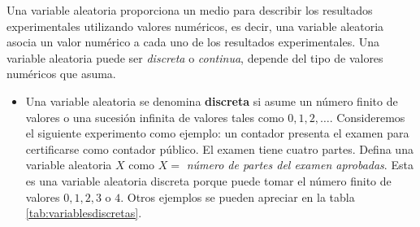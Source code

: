 \documentclass[
]{book}
\providecommand{\tightlist}{%
  \setlength{\itemsep}{0pt}\setlength{\parskip}{0pt}}
\theoremstyle{definition}
\theoremstyle{definition}
\theoremstyle{definition}
\theoremstyle{definition}
\theoremstyle{remark}
\begin{document}
Una variable aleatoria proporciona un medio para describir los resultados experimentales utilizando valores numéricos, es decir, una variable aleatoria asocia un valor numérico a cada uno de los resultados experimentales. Una variable aleatoria puede ser \emph{discreta} o \emph{continua}, depende del tipo de valores numéricos que asuma. \citep[página 187]{anderson}

\begin{itemize}
\tightlist
\item
  Una variable aleatoria se denomina \textbf{discreta} si asume un número finito de valores o una sucesión infinita de valores tales como \(0,1,2,\ldots\). Consideremos el siguiente experimento como ejemplo: un contador presenta el examen para certificarse como contador público. El examen tiene cuatro partes. Defina una variable aleatoria \(X\) como \(X =\) \emph{número de partes del examen aprobadas}. Esta es una variable aleatoria discreta porque puede tomar el número finito de valores \(0,1,2,3\) o \(4\). Otros ejemplos se pueden apreciar en la tabla \ref{tab:variablesdiscretas}.
\end{itemize}

\begin{table}[H]

\caption{\label{tab:variablesdiscretas}Ejemplos de variables aleatorias discretas}
\centering
{}
\end{table}
\end{document}
